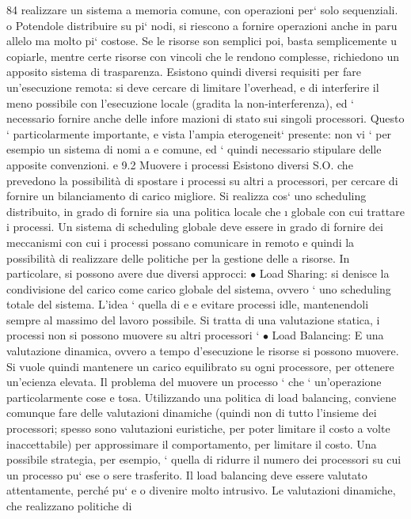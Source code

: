 \documentclass[a4paper,12pt]{article}
\begin{document}
84
realizzare un sistema a memoria comune, con operazioni per` solo sequenziali.
o
Potendole distribuire su pi` nodi, si riescono a fornire operazioni anche in paru
allelo ma molto pi` costose. Se le risorse son semplici poi, basta semplicemente
u
copiarle, mentre certe risorse con vincoli che le rendono complesse, richiedono
un apposito sistema di trasparenza.
Esistono quindi diversi requisiti per fare un'esecuzione remota: si deve cercare di limitare l'overhead, e di
interferire il meno possibile con l'esecuzione
locale (gradita la non-interferenza), ed ` necessario fornire anche delle infore
mazioni di stato sui singoli processori. Questo ` particolarmente importante,
e
vista l'ampia eterogeneit` presente: non vi ` per esempio un sistema di nomi
a
e
comune, ed ` quindi necessario stipulare delle apposite convenzioni.
e
9.2
Muovere i processi
Esistono diversi S.O. che prevedono la possibilità di spostare i processi su altri
a
processori, per cercare di fornire un bilanciamento di carico migliore. Si realizza
cos` uno scheduling distribuito, in grado di fornire sia una politica locale che
\i{}
globale con cui trattare i processi. Un sistema di scheduling globale deve essere
in grado di fornire dei meccanismi con cui i processi possano comunicare in
remoto e quindi la possibilità di realizzare delle politiche per la gestione delle
a
risorse.
In particolare, si possono avere due diversi approcci:
$\bullet$ Load Sharing: si denisce la condivisione del carico come carico globale
del sistema, ovvero ` uno scheduling totale del sistema. L'idea ` quella di
e
e
evitare processi idle, mantenendoli sempre al massimo del lavoro possibile.
Si tratta di una valutazione statica, i processi non si possono muovere su
altri processori
`
$\bullet$ Load Balancing: E una valutazione dinamica, ovvero a tempo d'esecuzione
le risorse si possono muovere. Si vuole quindi mantenere un carico equilibrato su ogni processore, per ottenere
un'ecienza elevata.
Il problema del muovere un processo ` che ` un'operazione particolarmente cose
e
tosa. Utilizzando una politica di load balancing, conviene comunque fare delle
valutazioni dinamiche (quindi non di tutto l'insieme dei processori; spesso sono
valutazioni euristiche, per poter limitare il costo a volte inaccettabile) per approssimare il comportamento, per
limitare il costo. Una possibile strategia, per
esempio, ` quella di ridurre il numero dei processori su cui un processo pu` ese
o
sere trasferito. Il load balancing deve essere valutato attentamente, perché pu`
e o
divenire molto intrusivo. Le valutazioni dinamiche, che realizzano politiche di
\end{document}
